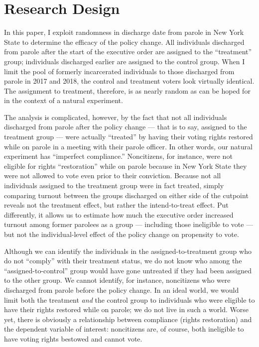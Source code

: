 \documentclass[
  12pt,
]{article}
\begin{document}
\hypertarget{research-design}{%
\section*{Research Design}\label{research-design}}

In this paper, I exploit randomness in discharge date from parole in New York State to determine the efficacy of the policy change. All individuals discharged from parole after the start of the executive order are assigned to the ``treatment'' group; individuals discharged earlier are assigned to the control group. When I limit the pool of formerly incarcerated individuals to those discharged from parole in 2017 and 2018, the control and treatment voters look virtually identical. The assignment to treatment, therefore, is as nearly random as can be hoped for in the context of a natural experiment.

The analysis is complicated, however, by the fact that not all individuals discharged from parole after the policy change --- that is to say, assigned to the treatment group --- were actually ``treated'' by having their voting rights restored while on parole in a meeting with their parole officer. In other words, our natural experiment has ``imperfect compliance.'' Noncitizens, for instance, were not eligible for rights ``restoration'' while on parole because in New York State they were not allowed to vote even prior to their conviction. Because not all individuals assigned to the treatment group were in fact treated, simply comparing turnout between the groups discharged on either side of the cutpoint reveals not the treatment effect, but rather the intend-to-treat effect. Put differently, it allows us to estimate how much the executive order increased turnout among former parolees as a group --- including those ineligible to vote --- but not the individual-level effect of the policy change on propensity to vote.

Although we can identify the individuals in the assigned-to-treatment group who do not ``comply'' with their treatment status, we do not know who among the ``assigned-to-control'' group would have gone untreated if they had been assigned to the other group. We cannot identify, for instance, noncitizens who were discharged from parole before the policy change. In an ideal world, we would limit both the treatment \emph{and} the control group to individuals who were eligible to have their rights restored while on parole; we do not live in such a world. Worse yet, there is obviously a relationship between compliance (rights restoration) and the dependent variable of interest: noncitizens are, of course, both ineligible to have voting rights bestowed and cannot vote.
\end{document}
